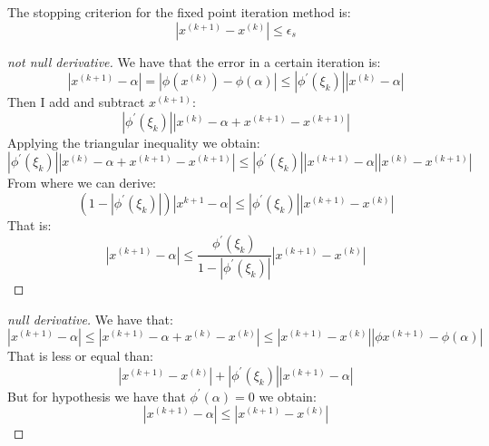 \documentclass[12pt, a4paper]{report}
\newtheorem[style=M,bodystyle=\normalfont]{theorem}{Theorem}
\newtheorem[style=M,bodystyle=\normalfont]{proposition}{Proposition}
\newtheorem[style=M,bodystyle=\normalfont]{corollary}{Corollary}
\newtheorem[style=M,bodystyle=\normalfont]{lemma}{Lemma}
\newtheorem[style=M,bodystyle=\normalfont]{definition}{Definition}
\begin{document}
    The stopping criterion for the fixed point iteration method is: 
    \[\left\lvert x^{(k+1)}-x^{(k)} \right\rvert \leq \epsilon_s\]
    \begin{proof}[not null derivative]
        We have that the error in a certain iteration is: 
        \[\left\lvert x^{(k+1)} - \alpha \right\rvert = \left\lvert \phi(x^{(k)}) - \phi(\alpha) \right\rvert \leq \left\lvert \phi^{'}(\xi_k)\right\rvert \left\lvert x^{(k)} - \alpha\right\rvert \]
        Then I add and subtract $x^{(k+1)}$: 
        \[\left\lvert \phi^{'}(\xi_k)\right\rvert \left\lvert x^{(k)} - \alpha + x^{(k+1)} - x^{(k+1)}\right\rvert\]
        Applying the triangular inequality we obtain: 
        \[\left\lvert \phi^{'}(\xi_k)\right\rvert 
        \left\lvert x^{(k)} - \alpha + x^{(k+1)} - x^{(k+1)}\right\rvert \leq 
        \left\lvert \phi^{'}(\xi_k)\right\rvert 
        \left\lvert x^{(k+1)} - \alpha \right\rvert 
        \left\lvert x^{(k)} - x^{(k+1)} \right\rvert\]
        From where we can derive: 
        \[\left( 1-\left\lvert \phi^{'}(\xi_k)\right\rvert \right) \left\lvert x^{k+1}-\alpha \right\rvert \leq \left\lvert \phi^{'}(\xi_k)\right\rvert \left\lvert x^{(k+1)} - x^{(k)} \right\rvert\]
        That is: 
        \[ \left\lvert x^{(k+1)} - \alpha \right\rvert \leq \dfrac{\phi^{'}(\xi_k)}{1-\left\lvert \phi^{'}(\xi_k)\right\rvert} \left\lvert x^{(k+1)} - x^{(k)} \right\rvert\]
    \end{proof}
    \begin{proof}[null derivative]
        We have that: 
        \[\left\lvert x^{(k+1)} - \alpha \right\rvert \leq \left\lvert x^{(k+1)} - \alpha + x^{(k)} - x^{(k)}\right\rvert \leq \left\lvert x^{(k+1)}-x^{(k)}\right\rvert \left\lvert \phi{x^{(k+1)}}-\phi(\alpha)\right\rvert\]
        That is less or equal than:
        \[ \left\lvert x^{(k+1)} - x^{(k)} \right\rvert 
        + 
        \left\lvert \phi^{'}(\xi_k) \right\rvert  
        \left\lvert x^{(k+1)} - \alpha \right\rvert\]
        But for hypothesis we have that $\phi^{'}(\alpha)=0$ we obtain: 
        \[ \left\lvert x^{(k+1)} - \alpha \right\rvert \leq \left\lvert x^{(k+1)} - x^{(k)} \right\rvert\]
    \end{proof}
\end{document}
